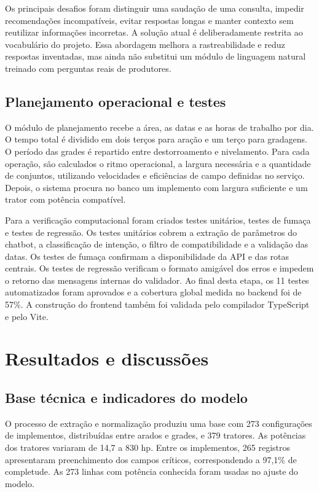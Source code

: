 \documentclass[12pt,a4paper]{article}
\begin{document}
Os principais desafios foram distinguir uma saudação de uma consulta, impedir recomendações incompatíveis, evitar respostas longas e manter contexto sem reutilizar informações incorretas. A solução atual é deliberadamente restrita ao vocabulário do projeto. Essa abordagem melhora a rastreabilidade e reduz respostas inventadas, mas ainda não substitui um módulo de linguagem natural treinado com perguntas reais de produtores.

\subsection{Planejamento operacional e testes}

O módulo de planejamento recebe a área, as datas e as horas de trabalho por dia. O tempo total é dividido em dois terços para aração e um terço para gradagens. O período das grades é repartido entre destorroamento e nivelamento. Para cada operação, são calculados o ritmo operacional, a largura necessária e a quantidade de conjuntos, utilizando velocidades e eficiências de campo definidas no serviço. Depois, o sistema procura no banco um implemento com largura suficiente e um trator com potência compatível.

Para a verificação computacional foram criados testes unitários, testes de fumaça e testes de regressão. Os testes unitários cobrem a extração de parâmetros do chatbot, a classificação de intenção, o filtro de compatibilidade e a validação das datas. Os testes de fumaça confirmam a disponibilidade da API e das rotas centrais. Os testes de regressão verificam o formato amigável dos erros e impedem o retorno das mensagens internas do validador. Ao final desta etapa, os 11 testes automatizados foram aprovados e a cobertura global medida no backend foi de 57\%. A construção do frontend também foi validada pelo compilador TypeScript e pelo Vite.

\section{Resultados e discussões}

\subsection{Base técnica e indicadores do modelo}

O processo de extração e normalização produziu uma base com 273 configurações de implementos, distribuídas entre arados e grades, e 379 tratores. As potências dos tratores variaram de 14,7 a 830 hp. Entre os implementos, 265 registros apresentaram preenchimento dos campos críticos, correspondendo a 97,1\% de completude. As 273 linhas com potência conhecida foram usadas no ajuste do modelo.
\end{document}
